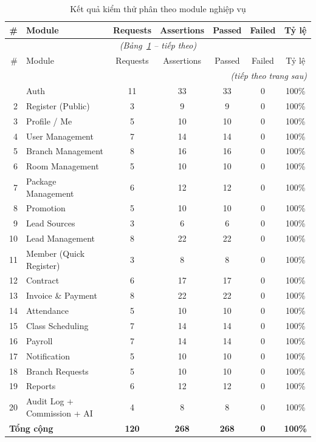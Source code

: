\begin{longtable}{r l c c c c c}
\caption{Kết quả kiểm thử phân theo module nghiệp vụ}
\label{tab:by-module} \\
\toprule
\# & Module & Requests & Assertions & Passed & Failed & Tỷ lệ \\
\midrule
\endfirsthead
\multicolumn{7}{c}{\textit{(Bảng~\ref{tab:by-module} – tiếp theo)}} \\
\toprule
\# & Module & Requests & Assertions & Passed & Failed & Tỷ lệ \\
\midrule
\endhead
\midrule \multicolumn{7}{r}{\textit{(tiếp theo trang sau)}} \\
\endfoot
\bottomrule
\endlastfoot
1  & Auth                          & 11 & 33  & 33  & 0 & 100\% \\
2  & Register (Public)             & 3  & 9   & 9   & 0 & 100\% \\
3  & Profile / Me                  & 5  & 10  & 10  & 0 & 100\% \\
4  & User Management               & 7  & 14  & 14  & 0 & 100\% \\
5  & Branch Management             & 8  & 16  & 16  & 0 & 100\% \\
6  & Room Management               & 5  & 10  & 10  & 0 & 100\% \\
7  & Package Management            & 6  & 12  & 12  & 0 & 100\% \\
8  & Promotion                     & 5  & 10  & 10  & 0 & 100\% \\
9  & Lead Sources                  & 3  & 6   & 6   & 0 & 100\% \\
10 & Lead Management               & 8  & 22  & 22  & 0 & 100\% \\
11 & Member (Quick Register)       & 3  & 8   & 8   & 0 & 100\% \\
12 & Contract                      & 6  & 17  & 17  & 0 & 100\% \\
13 & Invoice \& Payment            & 8  & 22  & 22  & 0 & 100\% \\
14 & Attendance                    & 5  & 10  & 10  & 0 & 100\% \\
15 & Class Scheduling              & 7  & 14  & 14  & 0 & 100\% \\
16 & Payroll                       & 7  & 14  & 14  & 0 & 100\% \\
17 & Notification                  & 5  & 10  & 10  & 0 & 100\% \\
18 & Branch Requests               & 5  & 10  & 10  & 0 & 100\% \\
19 & Reports                       & 6  & 12  & 12  & 0 & 100\% \\
20 & Audit Log + Commission + AI   & 4  & 8   & 8   & 0 & 100\% \\
\midrule
\multicolumn{2}{l}{\textbf{Tổng cộng}} & \textbf{120} & \textbf{268} & \textbf{268} & \textbf{0} & \textbf{100\%} \\
\end{longtable}

